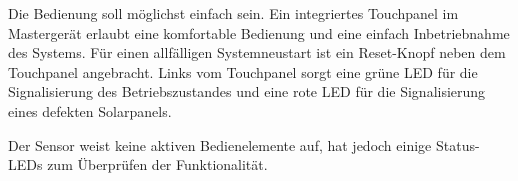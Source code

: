 Die  Bedienung  soll  m\"oglichst einfach  sein. Ein  integriertes  Touchpanel
im  Masterger\"at   erlaubt  eine  komfortable  Bedienung   und  eine  einfach
Inbetriebnahme des  Systems. F\"ur einen allf\"alligen Systemneustart  ist ein
Reset-Knopf neben  dem Touchpanel angebracht. Links vom  Touchpanel sorgt eine
gr\"une LED f\"ur  die Signalisierung des Betriebszustandes und  eine rote LED
f\"ur die Signalisierung eines defekten Solarpanels.

Der  Sensor  weist  keine  aktiven   Bedienelemente  auf,  hat  jedoch  einige
Status-LEDs zum \"Uberpr\"ufen der Funktionalit\"at.
